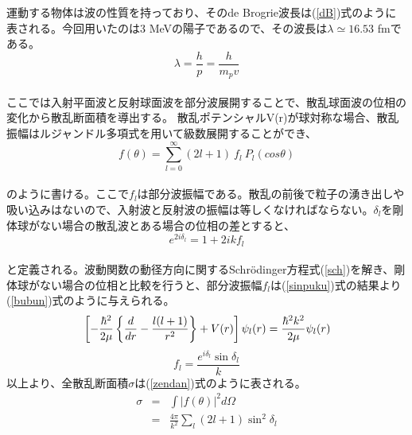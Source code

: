 \documentclass[a4paper,11pt,dvipdfmx]{jsarticle}
\begin{document}
運動する物体は波の性質を持っており、そのde Brogrie波長は(\ref{dB})式のように表される。今回用いたのは3 MeVの陽子であるので、その波長は$\lambda \simeq 16.53$ fmである。\\
\begin{equation}
    \lambda = \frac{h}{p} = \frac{h}{m_{p}v}
    \label{dB}
\end{equation}\\
ここでは入射平面波と反射球面波を部分波展開することで、散乱球面波の位相の変化から散乱断面積を導出する。
散乱ポテンシャルV(r)が球対称な場合、散乱振幅はルジャンドル多項式を用いて級数展開することができ、\\
\begin{equation}
    f(\theta) = \sum_{l=0}^{\infty} (2l+1) \: f_l \: P_l (cos\theta) 
\end{equation}\\
のように書ける。ここで$f_l$は部分波振幅である。散乱の前後で粒子の湧き出しや吸い込みはないので、入射波と反射波の振幅は等しくなければならない。$\delta_l$を剛体球がない場合の散乱波とある場合の位相の差とすると、\\
\begin{equation}
    e^{2i\delta_l} = 1 + 2ikf_l
    \label{sinpuku}
\end{equation}\\
と定義される。波動関数の動径方向に関するSchr\"{o}dinger方程式(\ref{sch})を解き、剛体球がない場合の位相と比較を行うと、部分波振幅$f_l$は(\ref{sinpuku})式の結果より(\ref{bubun})式のように与えられる。\\
\begin{equation}\\
    \left[-\frac{\hbar^2}{2\mu}\left\{\frac{d}{dr}-\frac{l(l+1)}{r^2}\right\} + V(r)\right]\psi_l(r) = \frac{\hbar^2k^2}{2\mu}\psi_l(r)
    \label{sch}
\end{equation}
\begin{equation}
    f_l = \frac{e^{i\delta_l}\sin \delta_l}{k}
    \label{bubun}
\end{equation}
以上より、全散乱断面積$\sigma$は(\ref{zendan})式のように表される。
\begin{eqnarray}
    \sigma &=& \int |f(\theta)|^2 d\Omega\\
    &=& \frac{4\pi}{k^2}\sum_{l}(2l+1)\sin^2 \delta_l
    \label{zendan}
\end{eqnarray}
\end{document}
